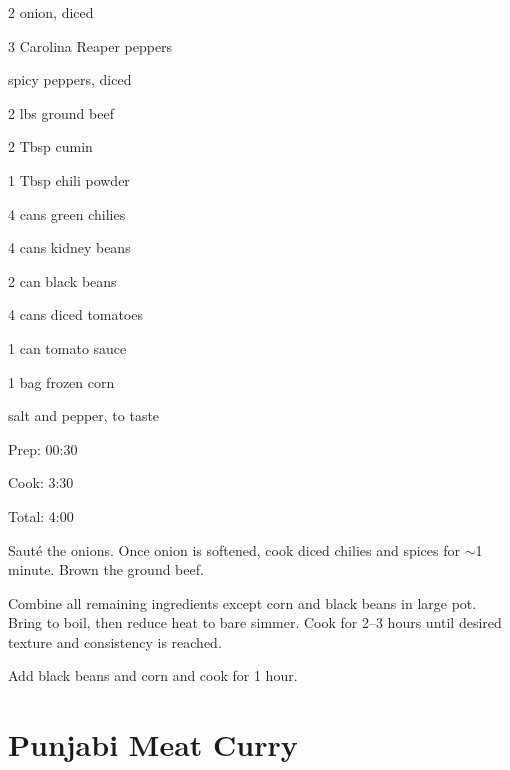 \documentclass[oneside]{book}  %
\def\thisrecipe{}  %
\newcommand{\recipe}[1]{\section{#1}\def\thisrecipe{: #1}} %
\newcommand{\itemNL}{\item[] \hspace{-\labelsep}}  %
\newcommand{\about}{$\sim$}
\begin{document}
\begin{IT}
  \begin{ingredients}
    \item[2] onion, diced
    \item[3] Carolina Reaper peppers
    \itemNL spicy peppers, diced
    \item[2 lbs] ground beef
    \item[2 Tbsp] cumin
    \item[1 Tbsp] chili powder
    \item[4 cans] green chilies
    \item[4 cans] kidney beans
    \item[2 can] black beans
    \item[4 cans] diced tomatoes
    \item[1 can] tomato sauce
    \item[1 bag] frozen corn
    \itemNL salt and pepper, to taste
  \end{ingredients}

  \switchcolumn

  \begin{timeline}
    \item[Prep:]  00:30
    \item[Cook:]  3:30
    \item[Total:] 4:00
  \end{timeline}
\end{IT}

\begin{directions}
  \item Saut\'e the onions. Once onion is softened, cook diced chilies and
    spices for \about 1 minute. Brown the ground beef.

  \item Combine all remaining ingredients except corn and black beans in large
    pot. Bring to boil, then reduce heat to bare simmer. Cook for 2--3 hours
    until desired texture and consistency is reached.

  \item Add black beans and corn and cook for 1 hour.
\end{directions}
\recipe{Punjabi Meat Curry} \label{recipe:punjabi_meat_curry} %
\end{document}
